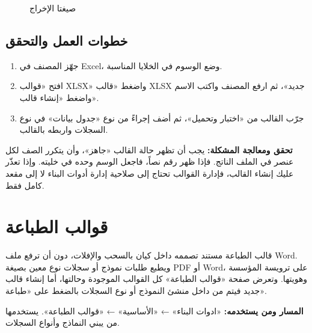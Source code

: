 \begin{figure}[H]
\centering
{}
\rclegend
\caption{صيغتا الإخراج}
\label{fig:builder-xlsx-outputs}
\end{figure}

\subsection{خطوات العمل والتحقق}
\begin{enumerate}
\item جهّز المصنف في Excel، وضع الوسوم في الخلايا المناسبة.
\item افتح «قوالب XLSX» واضغط «قالب XLSX جديد»، ثم ارفع المصنف واكتب الاسم واضغط «إنشاء قالب».
\item جرّب القالب من «اختبار وتحميل»، ثم أضف إجراءً من نوع «جدول بيانات» في نوع السجلات واربطه بالقالب.
\end{enumerate}

\textbf{تحقق ومعالجة المشكلة:} يجب أن تظهر حالة القالب «جاهز»، وأن يتكرر الصف لكل عنصر في الملف الناتج. فإذا ظهر رقم نصاً، فاجعل الوسم وحده في خليته. وإذا تعذّر عليك إنشاء القالب، فإدارة القوالب تحتاج إلى صلاحية إدارة أدوات البناء لا إلى مقعد كامل فقط.

\clearpage
\section{قوالب الطباعة}
\label{sec:builder-feature-print-templates}

قالب الطباعة مستند تصممه داخل كيان بالسحب والإفلات، دون أن ترفع ملف Word. ويطبع طلبات نموذج أو سجلات نوع معين بصيغة PDF أو Word، على ترويسة المؤسسة وهويتها. وتعرض صفحة «قوالب الطباعة» كل القوالب الموجودة وحالتها، أما إنشاء قالب جديد فيتم من داخل منشئ النموذج أو نوع السجلات بالضغط على «طباعة».

\textbf{المسار ومن يستخدمه:} «ادوات البناء» ← «الأساسية» ← «قوالب الطباعة». يستخدمها من يبني النماذج وأنواع السجلات.

